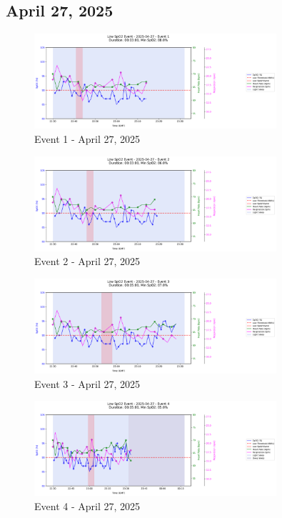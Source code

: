 \documentclass{article}
\begin{document}
\subsection{April 27, 2025}
\begin{figure}[htbp]
    \centering
    \includegraphics[width=0.8\textwidth]{images/2025-04-27_event_1.png}
    \caption{Event 1 - April 27, 2025}
\end{figure}
\begin{figure}[htbp]
    \centering
    \includegraphics[width=0.8\textwidth]{images/2025-04-27_event_2.png}
    \caption{Event 2 - April 27, 2025}
\end{figure}
\begin{figure}[htbp]
    \centering
    \includegraphics[width=0.8\textwidth]{images/2025-04-27_event_3.png}
    \caption{Event 3 - April 27, 2025}
\end{figure}
\begin{figure}[htbp]
    \centering
    \includegraphics[width=0.8\textwidth]{images/2025-04-27_event_4.png}
    \caption{Event 4 - April 27, 2025}
\end{figure}
\end{document}
